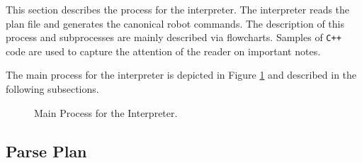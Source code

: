 
This section describes the process for the interpreter. The interpreter reads the plan file and generates the canonical robot commands. The description of this process and subprocesses are mainly described via flowcharts. Samples of \verb!C++! code are used to capture the attention of the reader on important notes.

The main process for the interpreter is depicted in Figure \ref{fig:interpreter} and described in the following subsections.


\begin{figure}[h!]
\centering
{}
\caption{Main Process for the Interpreter.}
\label{fig:interpreter}
\end{figure}



\subsection{Parse Plan}

